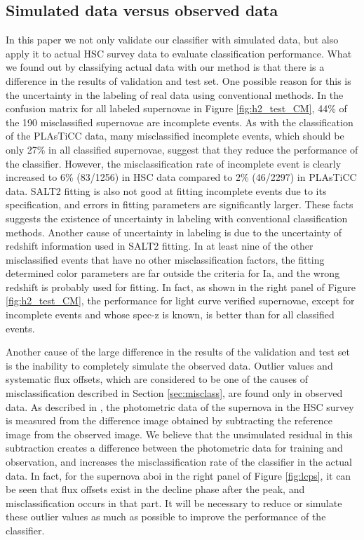 \documentclass[useamsfonts]{pasj01}
\begin{document}
\subsection{Simulated data versus observed data}
%
In this paper we not only validate our classifier with simulated data, but also apply it to actual HSC survey data to evaluate classification performance.
What we found out by classifying actual data with our method is that there is a difference in the results of validation and test set.
One possible reason for this is the uncertainty in the labeling of real data using conventional methods.
In the confusion matrix for all labeled supernovae in Figure \ref{fig:h2_test_CM}, 44\% of the 190 misclassified supernovae are incomplete events.
As with the classification of the PLAsTiCC data, many misclassified incomplete events, which should be only 27\% in all classified supernovae, suggest that they reduce the performance of the classifier.
However, the misclassification rate of incomplete event is clearly increased to 6\% (83/1256) in HSC data compared to 2\% (46/2297) in PLAsTiCC data.
SALT2 fitting is also not good at fitting incomplete events due to its specification, and errors in fitting parameters are significantly larger.
These facts suggests the existence of uncertainty in labeling with conventional classification methods.
Another cause of uncertainty in labeling is due to the uncertainty of redshift information used in SALT2 fitting.
In at least nine of the other misclassified events that have no other misclassification factors, the fitting determined color parameters are far outside the criteria for Ia, and the wrong redshift is probably used for fitting.
In fact, as shown in the right panel of Figure \ref{fig:h2_test_CM}, the performance for light curve verified supernovae, except for incomplete events and whose spec-z is known, is better than for all classified events.

Another cause of the large difference in the results of the validation and test set is the inability to completely simulate the observed data.
Outlier values and systematic flux offsets, which are considered to be one of the causes of misclassification described in Section \ref{sec:misclass}, are found only in observed data.
As described in \citet{yasuda19a}, the photometric data of the supernova in the HSC survey is measured from the difference image obtained by subtracting the reference image from the observed image.
We believe that the unsimulated residual in this subtraction creates a difference between the photometric data for training and observation, and increases the misclassification rate of the classifier in the actual data.
In fact, for the supernova aboi in the right panel of Figure \ref{fig:lcps}, it can be seen that flux offsets exist in the decline phase after the peak, and misclassification occurs in that part.
It will be necessary to reduce or simulate these outlier values as much as possible to improve the performance of the classifier.
%
%
\end{document}
